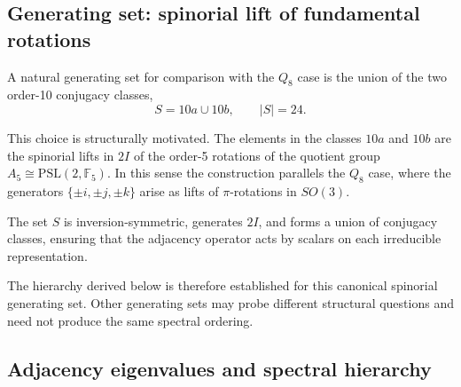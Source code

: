   \subsection{Generating set: spinorial lift of fundamental rotations}
    \label{sec:step5-genset}

    A natural generating set for comparison with the $Q_8$ case is the union of
    the two order-10 conjugacy classes,
    \begin{equation}
      S = 10a \cup 10b,
      \qquad
      |S| = 24.
      \label{eq:S-2I}
    \end{equation}

    This choice is structurally motivated.
    The elements in the classes $10a$ and $10b$ are the spinorial lifts in $2I$
    of the order-5 rotations of the quotient group
    $A_5 \cong \mathrm{PSL}(2,\mathbb{F}_5)$.
    In this sense the construction parallels the $Q_8$ case, where the generators
    $\{\pm i,\pm j,\pm k\}$ arise as lifts of $\pi$-rotations in $SO(3)$.

    The set $S$ is inversion-symmetric, generates $2I$, and forms a union of
    conjugacy classes, ensuring that the adjacency operator acts by scalars
    on each irreducible representation.

    The hierarchy derived below is therefore established for this canonical
    spinorial generating set.
    Other generating sets may probe different structural questions and need
    not produce the same spectral ordering.

  \subsection{Adjacency eigenvalues and spectral hierarchy}
    \label{sec:step5-spectrum}

